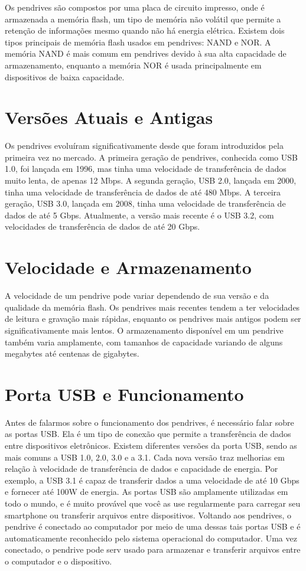 \documentclass[a4paper, 12pt]{article}
\begin{document}
	Os pendrives são compostos por uma placa de circuito impresso, onde é armazenada a memória flash, um tipo de memória não volátil que permite a retenção de informações mesmo quando não há energia elétrica. Existem dois tipos principais de memória flash usados em pendrives: NAND e NOR. A memória NAND é mais comum em pendrives devido à sua alta capacidade de armazenamento, enquanto a memória NOR é usada principalmente em dispositivos de baixa capacidade.
	
	\section{Versões Atuais e Antigas}
	
	Os pendrives evoluíram significativamente desde que foram introduzidos pela primeira vez no mercado. A primeira geração de pendrives, conhecida como USB 1.0, foi lançada em 1996, mas tinha uma velocidade de transferência de dados muito lenta, de apenas 12 Mbps. A segunda geração, USB 2.0, lançada em 2000, tinha uma velocidade de transferência de dados de até 480 Mbps. A terceira geração, USB 3.0, lançada em 2008, tinha uma velocidade de transferência de dados de até 5 Gbps. Atualmente, a versão mais recente é o USB 3.2, com velocidades de transferência de dados de até 20 Gbps.
	
	\section{Velocidade e Armazenamento}
	
	A velocidade de um pendrive pode variar dependendo de sua versão e da qualidade da memória flash. Os pendrives mais recentes tendem a ter velocidades de leitura e gravação mais rápidas, enquanto os pendrives mais antigos podem ser significativamente mais lentos. O armazenamento disponível em um pendrive também varia amplamente, com tamanhos de capacidade variando de alguns megabytes até centenas de gigabytes.
	
	\section{Porta USB e Funcionamento}
	
	Antes de falarmos sobre o funcionamento dos pendrives, é necessário falar sobre as portas USB. Ela é um tipo de conexão que permite a transferência de dados entre dispositivos eletrônicos. Existem diferentes versões da porta USB, sendo as mais comuns a USB 1.0, 2.0, 3.0 e a 3.1. Cada nova versão traz melhorias em relação à velocidade de transferência de dados e capacidade de energia. Por exemplo, a USB 3.1 é capaz de transferir dados a uma velocidade de até 10 Gbps e fornecer até 100W de energia. As portas USB são amplamente utilizadas em todo o mundo, e é muito provável que você as use regularmente para carregar seu smartphone ou transferir arquivos entre dispositivos. Voltando aos pendrives, o pendrive é conectado ao computador por meio de uma dessas tais portas USB e é automaticamente reconhecido pelo sistema operacional do computador. Uma vez conectado, o pendrive pode serv usado para armazenar e transferir arquivos entre o computador e o dispositivo.
	
\end{document}
